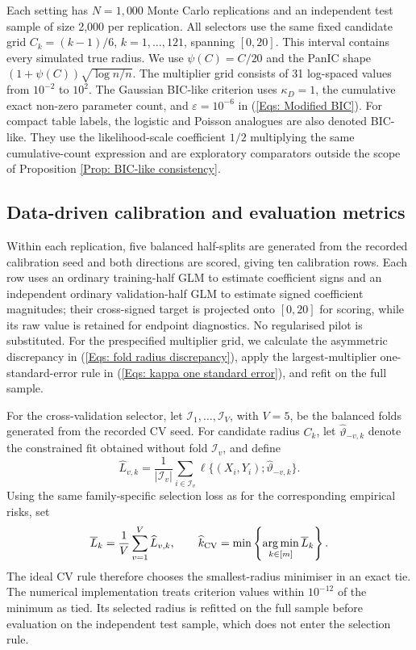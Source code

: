 \documentclass[12pt]{article}
\DeclareMathOperator*{\argmin}{arg\,min}
\newenvironment{bluechange}{\begingroup\color[rgb]{0.00,0.00,1.00}}{\endgroup}
\theoremstyle{remark}
\theoremstyle{plain}
\begin{document}
\begin{bluechange}
Each setting has $N=1{,}000$ Monte Carlo replications and an independent test sample of size 2,000 per replication. All selectors use the same fixed candidate grid $C_k=(k-1)/6$, $k=1,\ldots,121$, spanning $[0,20]$. This interval contains every simulated true radius. We use $\psi(C)=C/20$ and the PanIC shape $(1+\psi(C))\sqrt{\log n/n}$. The multiplier grid consists of 31 log-spaced values from $10^{-2}$ to $10^2$. The Gaussian BIC-like criterion uses $\kappa_D=1$, the cumulative exact non-zero parameter count, and $\varepsilon=10^{-6}$ in (\ref{Eqs: Modified BIC}). For compact table labels, the logistic and Poisson analogues are also denoted BIC-like. They use the likelihood-scale coefficient $1/2$ multiplying the same cumulative-count expression and are exploratory comparators outside the scope of Proposition \ref{Prop: BIC-like consistency}.


\subsection{Data-driven calibration and evaluation metrics}\label{Sect: calibration}
Within each replication, five balanced half-splits are generated from the recorded calibration seed and both directions are scored, giving ten calibration rows. Each row uses an ordinary training-half GLM to estimate coefficient signs and an independent ordinary validation-half GLM to estimate signed coefficient magnitudes; their cross-signed target is projected onto $[0,20]$ for scoring, while its raw value is retained for endpoint diagnostics. No regularised pilot is substituted. For the prespecified multiplier grid, we calculate the asymmetric discrepancy in (\ref{Eqs: fold radius discrepancy}), apply the largest-multiplier one-standard-error rule in (\ref{Eqs: kappa one standard error}), and refit on the full sample.

For the cross-validation selector, let $\mathcal I_1,\ldots,\mathcal I_V$, with $V=5$, be the balanced folds generated from the recorded CV seed. For candidate radius $C_k$, let $\widehat\vartheta_{-v,k}$ denote the constrained fit obtained without fold $\mathcal I_v$, and define
\[
\widehat L_{v,k}
=\frac{1}{|\mathcal I_v|}
\sum_{i\in\mathcal I_v}
\ell\{(X_i,Y_i);\widehat\vartheta_{-v,k}\}.
\]
Using the same family-specific selection loss as for the corresponding empirical risks, set
\[
\overline L_k=\frac{1}{V}\sum_{v=1}^V\widehat L_{v,k},
\qquad
\widehat k_{\rm CV}
=\min\left\{\argmin_{k\in[m]}\overline L_k\right\}.
\]
The ideal CV rule therefore chooses the smallest-radius minimiser in an exact tie. The numerical implementation treats criterion values within $10^{-12}$ of the minimum as tied. Its selected radius is refitted on the full sample before evaluation on the independent test sample, which does not enter the selection rule.


\end{bluechange}
\end{document}
